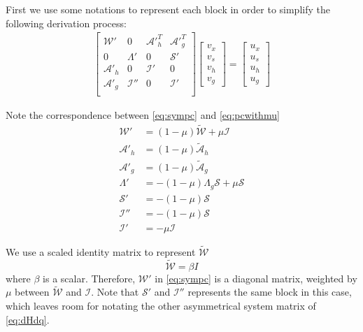 \documentclass{article}
\theoremstyle{definition}
\begin{document}
First we use some notations to represent each block in order to simplify the following derivation process:
\begin{equation}\label{eq:sympc}
\begin{aligned}
\begin{bmatrix}
\mathcal{W}' & 0 & \mathcal{A}'^T_h   & \mathcal{A}'^T_g   \\
0     &   \Lambda'  & 0 &\mathcal{S}'  \\
\mathcal{A}'_h& 0  &  \mathcal{I}' & 0  \\
\mathcal{A}'_g & \mathcal{I}''   &  0    &  \mathcal{I}' \\
\end{bmatrix}
\begin{bmatrix} v_x \\ v_s \\ v_h \\ v_g \end{bmatrix}=\begin{bmatrix} u_x \\ u_s \\ u_h \\ u_g \end{bmatrix}
\end{aligned}
\end{equation}

Note the correspondence between \eqref{eq:sympc} and \eqref{eq:pcwithmu}
\begin{equation}
\begin{aligned}
\mathcal{W}' &= (1-\mu) \tilde{\mathcal{W}} + \mu \mathcal{I} \\
\mathcal{A}'_h &= (1-\mu)\tilde{\mathcal{A}}_{h} \\
\mathcal{A}'_g &= (1-\mu)\tilde{\mathcal{A}}_{g} \\
\Lambda' &=  -(1-\mu) \Lambda_g \mathcal{S} + \mu  \mathcal{S}  \\
\mathcal{S}' &= -(1-\mu)\mathcal{S} \\
\mathcal{I}'' &= -(1-\mu)\mathcal{S} \\
\mathcal{I}' &= -\mu \mathcal{I}  
\end{aligned}
\end{equation}

We use a scaled identity matrix to represent $\tilde{\mathcal{W}}$
\begin{equation}
\tilde{\mathcal{W}} = \beta I
\end{equation}
where $\beta$ is a scalar. Therefore, $\mathcal{W}'$ in \eqref{eq:sympc} is a diagonal matrix, weighted by $\mu$ between $\tilde{\mathcal{W}}$ and $\mathcal{I}$. Note that $\mathcal{S}'$ and $\mathcal{I}''$ represents the same block in this case, which leaves room for notating the other asymmetrical system matrix of \eqref{eq:dHdq}. 
\end{document}
